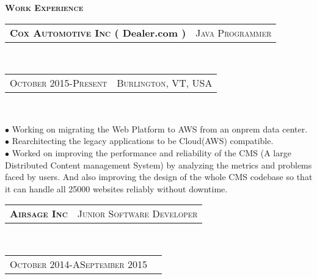 \documentclass[10pt,a4paper,oneside]{article}
\begin{document}
    \begin{minipage}[t]{0.63\textwidth}
        \vspace{0pt}
        \textcolor{light-gray}{\textbf{\large W\textsc{ork} E\textsc{xperience}}}
        \vspace{10pt}\\
        \begin{tabular}{c|c}
            \textbf{\normalsize C\textsc{ox} A\textsc{utomotive} I\textsc{nc} ( Dealer.com )}
            &\textmd{\normalsize J\textsc{ava} P\textsc{rogrammer}}
        \end{tabular}\\
        \textcolor{light-gray}{
            \begin{tabular}{c|c}
                {\small O\textsc{ctober 2015}-P\textsc{resent}}
               &{\small B\textsc{urlington}, VT, USA}
            \end{tabular}
        }\\ 
        \vspace{-4mm}
        \begin{adjustwidth}{7pt}{0pt}
            {\footnotesize $\bullet$  Working on migrating the Web Platform to AWS from an onprem data center.\\
            $\bullet$ Rearchitecting the legacy applications to be Cloud(AWS) compatible.\\
        $\bullet$  Worked on improving the performance and reliability of the CMS (A large Distributed Content management System) by analyzing the metrics and problems faced by users. And also improving the design of the whole CMS codebase so that it can handle all 25000 websites reliably without downtime.}\\
        \end{adjustwidth}
        \begin{tabular}{c|c}
            \textbf{\normalsize A\textsc{irsage} I\textsc{nc}}
            &\textmd{\normalsize J\textsc{unior} S\textsc{oftware} D\textsc{eveloper}}
        \end{tabular}\\
        \textcolor{light-gray}{
            \begin{tabular}{c|c}
                {\small O\textsc{ctober 2014}-A\textsc{September 2015}}

\end{tabular}}
\end{minipage}
\end{document}
